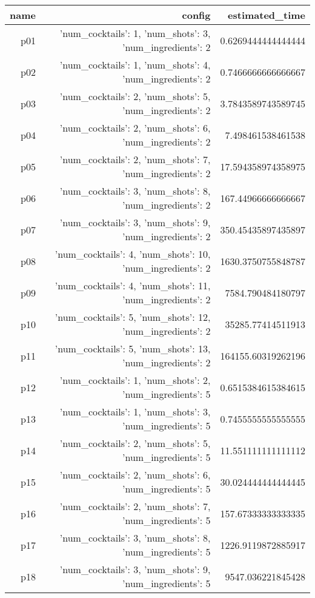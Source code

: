 \documentclass{article}
\begin{document}
                            \begin{center}
                            \scriptsize
                            \begin{tabular}{r|r|r}
                            name & config & estimated\_time\\\midrule
                              p01&{'num\_cocktails': 1, 'num\_shots': 3, 'num\_ingredients': 2}&0.6269444444444444\\
  p02&{'num\_cocktails': 1, 'num\_shots': 4, 'num\_ingredients': 2}&0.7466666666666667\\
  p03&{'num\_cocktails': 2, 'num\_shots': 5, 'num\_ingredients': 2}&3.7843589743589745\\
  p04&{'num\_cocktails': 2, 'num\_shots': 6, 'num\_ingredients': 2}&7.498461538461538\\
  p05&{'num\_cocktails': 2, 'num\_shots': 7, 'num\_ingredients': 2}&17.594358974358975\\
  p06&{'num\_cocktails': 3, 'num\_shots': 8, 'num\_ingredients': 2}&167.44966666666667\\
  p07&{'num\_cocktails': 3, 'num\_shots': 9, 'num\_ingredients': 2}&350.45435897435897\\
  p08&{'num\_cocktails': 4, 'num\_shots': 10, 'num\_ingredients': 2}&1630.3750755848787\\
  p09&{'num\_cocktails': 4, 'num\_shots': 11, 'num\_ingredients': 2}&7584.790484180797\\
  p10&{'num\_cocktails': 5, 'num\_shots': 12, 'num\_ingredients': 2}&35285.77414511913\\
  p11&{'num\_cocktails': 5, 'num\_shots': 13, 'num\_ingredients': 2}&164155.60319262196\\
  p12&{'num\_cocktails': 1, 'num\_shots': 2, 'num\_ingredients': 5}&0.6515384615384615\\
  p13&{'num\_cocktails': 1, 'num\_shots': 3, 'num\_ingredients': 5}&0.7455555555555555\\
  p14&{'num\_cocktails': 2, 'num\_shots': 5, 'num\_ingredients': 5}&11.551111111111112\\
  p15&{'num\_cocktails': 2, 'num\_shots': 6, 'num\_ingredients': 5}&30.024444444444445\\
  p16&{'num\_cocktails': 2, 'num\_shots': 7, 'num\_ingredients': 5}&157.67333333333335\\
  p17&{'num\_cocktails': 3, 'num\_shots': 8, 'num\_ingredients': 5}&1226.9119872885917\\
  p18&{'num\_cocktails': 3, 'num\_shots': 9, 'num\_ingredients': 5}&9547.036221845428\\

\end{tabular}
\end{center}
\end{document}
